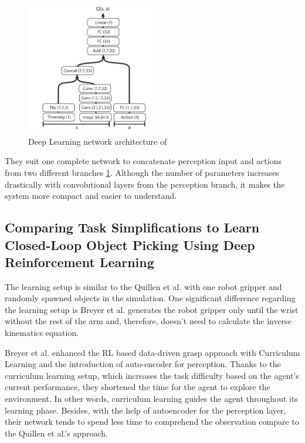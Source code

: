 \begin{figure}[htbp]
    \centering
    \includegraphics[width=0.5\textwidth]{figures/dql}
    \caption{Deep Learning network architecture of \cite{Quillen2018}}
    \label{fig:dql}
\end{figure}

They suit one complete network to concatenate perception input and actions from two different branches \ref{fig:dql}. Although the number of parameters increases drastically with convolutional layers from the perception branch, it makes the system more compact and easier to understand.

\subsection{Comparing Task Simplifications to Learn Closed-Loop Object Picking Using Deep Reinforcement Learning}

The learning setup is similar to the Quillen et al. with one robot gripper and randomly spawned objects in the simulation. One significant difference regarding the learning setup is Breyer et al. generates the robot gripper only until the wrist without the rest of the arm and, therefore, doesn’t need to calculate the inverse kinematics equation.

Breyer et al. enhanced the RL based data-driven grasp approach with Curriculum Learning and the introduction of auto-encoder for perception. Thanks to the curriculum learning setup, which increases the task difficulty based on the agent’s current performance, they shortened the time for the agent to explore the environment. In other words, curriculum learning guides the agent throughout its learning phase. Besides, with the help of autoencoder for the perception layer, their network tends to spend less time to comprehend the observation compare to the Quillen et al.’s approach. 

